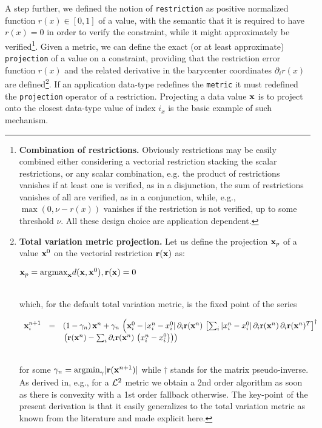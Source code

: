 \documentclass[a4,12pt]{article}
\newcommand{\eqline}[1]{\\\centerline{$#1$}\\}
\begin{document}
A step further, we defined the notion of {\tt restriction} as positive normalized function $r(x) \in [0, 1]$ of a value, with the semantic that it is required to have $r(x) = 0$ in order to verify the constraint, while it might approximately be verified\footnote{{\bf Combination of restrictions.} Obviously restrictions may be easily combined either considering a vectorial restriction stacking the scalar restrictions, or any scalar combination, e.g. the product of restrictions vanishes if at least one is verified, as in a disjunction, the sum of restrictions vanishes of all are verified, as in a conjunction, while, e.g., $\max(0, \nu - r(x))$ vanishes if the restriction is not verified, up to some threshold $\nu$. All these design choice are application dependent.}. Given a metric, we can define the exact (or at least approximate) {\tt projection} of a value on a constraint, providing that the restriction error function $r(x)$ and the related derivative in the barycenter coordinates $\partial_i r(x)$ are defined\footnote{{\bf Total variation metric projection.} Let us define the projection ${\bf x}_p$ of a value ${\bf x}^0$ on the vectorial restriction ${\bf r}({\bf x})$ as:
\eqline{{\bf x}_p = \mbox{argmax}_{\bf x} d({\bf x}, {\bf x}^0), {\bf r}({\bf x}) = 0}
which, for the default total variation metric, is the fixed point of the series
\eqline{\begin{array}{rcl} {\bf x}^{n+1}_i &=& (1-\gamma_n) \, {\bf x}^{n} + \gamma_n \, \left({\bf x}^0_i - |x^{n}_i - x^0_i| \, \partial_i {\bf r}({\bf x}^{n}) \, \left[ \sum_i |x^{n}_i - x^0_i| \, \partial_i {\bf r}({\bf x}^{n}) \, \partial_i {\bf r}({\bf x}^{n})^T \right]^\dagger \, \right. \\ && \left. \left({\bf r}({\bf x}^{n}) - \sum_i \partial_i {\bf r}({\bf x}^{n}) \, \left(x^{n}_i - x^0_i\right)\right)\right) \\ \end{array}}
for some $\gamma_n = \mbox{argmin}_\gamma |{\bf r}({\bf x}^{n+1})|$ while $\dagger$ stands for the matrix pseudo-inverse. As derived in, e.g., \cite{vieville:inria-00074888} for a ${\cal L}^2$ metric we obtain a 2nd order algorithm as soon as there is convexity with a 1st order fallback otherwise. The key-point of the present derivation is that it easily generalizes to the total variation metric as known from the literature and made explicit here.}. If an application data-type redefines the {\tt metric} it must redefined the {\tt projection} operator of a restriction.
Projecting a data value ${\bf x}$ is to project onto the closest data-type value of index $i_x$ is the basic example of such mechanism.
\end{document}
